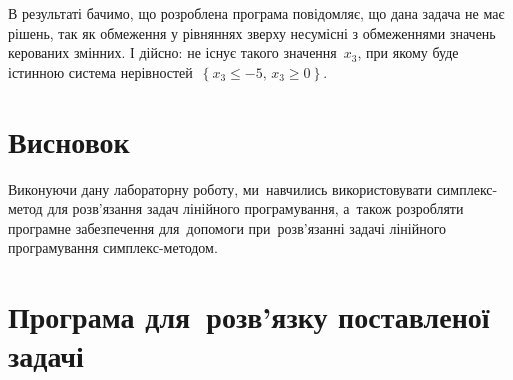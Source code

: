\documentclass[
  a4paper,
  oneside,
  BCOR = 10mm,
  DIV = 12,
  12pt,
  headings = normal,
]{scrartcl}
\begin{document}
    В результаті бачимо, що розроблена програма повідомляє, що дана задача не має рішень, так як обмеження у рівняннях зверху несумісні з обмеженнями значень керованих змінних. І дійсно: не існує такого значення~$x_3$, при якому буде істинною система нерівностей~$\left\{ x_{3} \leqslant -5, \, x_{3} \geqslant 0\right\}$.

  \section{Висновок}
    Виконуючи дану лабораторну роботу, ми~навчились використовувати симплекс-метод для розв'язання задач лінійного програмування, а~також розробляти програмне забезпечення для~допомоги при~розв'язанні задачі лінійного програмування симплекс-методом.

  \appendix
  \section{Програма для~розв'язку поставленої задачі}

\end{document}

